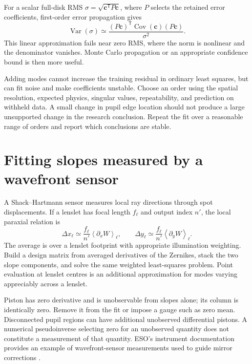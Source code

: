 For a scalar full-disk RMS $\sigma=\sqrt{\bm c^{\mathsf T}P\bm c}$,
where $P$ selects the retained error coefficients, first-order error
propagation gives
\begin{equation}
 \operatorname{Var}(\sigma)\simeq
 \frac{(P\bm c)^{\mathsf T}\operatorname{Cov}(\bm c)(P\bm c)}
      {\sigma^2}.
\end{equation}
This linear approximation fails near zero RMS, where the norm is
nonlinear and the denominator vanishes. Monte Carlo propagation or an
appropriate confidence bound is then more useful.

Adding modes cannot increase the training residual in ordinary least
squares, but can fit noise and make coefficients unstable. Choose an
order using the spatial resolution, expected physics, singular values,
repeatability, and prediction on withheld data. A small change in pupil
edge location should not produce a large unsupported change in the
research conclusion. Repeat the fit over a reasonable range of orders
and report which conclusions are stable.

\section{Fitting slopes measured by a wavefront sensor}
A Shack--Hartmann sensor measures local ray directions through spot
displacements. If a lenslet has focal length $f_\ell$ and output index
$n'$, the local paraxial relation is
\begin{equation}
 \Delta x_\ell\simeq\frac{f_\ell}{n'}
                   \left\langle\partial_x W\right\rangle_\ell,
 \qquad
 \Delta y_\ell\simeq\frac{f_\ell}{n'}
                   \left\langle\partial_y W\right\rangle_\ell.
\end{equation}
The average is over a lenslet footprint with appropriate illumination
weighting. Build a design matrix from averaged derivatives of the
Zernikes, stack the two slope components, and solve the same weighted
least-squares problem. Point evaluation at lenslet centres is an
additional approximation for modes varying appreciably across a
lenslet.

Piston has zero derivative and is unobservable from slopes alone; its
column is identically zero. Remove it from the fit or impose a gauge
such as zero mean. Disconnected pupil regions can have additional
unobserved differential pistons. A numerical pseudoinverse selecting
zero for an unobserved quantity does not constitute a measurement of
that quantity. ESO's instrument documentation provides an example of
wavefront-sensor measurements used to guide mirror corrections
\cite{zc:esoSensor}.

